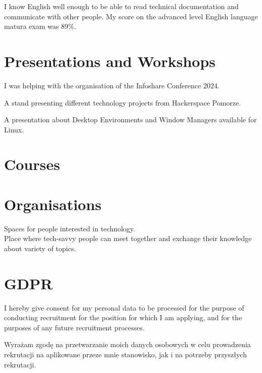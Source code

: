 \documentclass[11pt, a4paper, sans, colorlinks]{moderncv}
\begin{document}
{I know English well enough to be able to read technical documentation and communicate with other people. My score on the advanced level English language matura exam was 89\%. }


\section{Presentations and Workshops}

{}{}
{I was helping with the organisation of the Infoshare Conference 2024.}

{}{}
{A stand presenting different technology projects from Hackerspace Pomorze.}

{}{}
{A presentation about Desktop Environments and Window Managers available for Linux.}

\section{Courses}


\section{Organisations}

{
	Spaces for people interested in technology.\\
	Place where tech-savvy people can meet together and exchange their knowledge about variety of topics.
}

\section{GDPR}

{I hereby give consent for my personal data to be processed for the purpose of conducting recruitment for the position for which I am applying, and for the purposes of any future recruitment processes.}

{Wyrażam zgodę na przetwarzanie moich danych osobowych w celu prowadzenia rekrutacji na aplikowane przeze mnie stanowisko, jak i na potrzeby przyszłych rekrutacji.}
\end{document}
